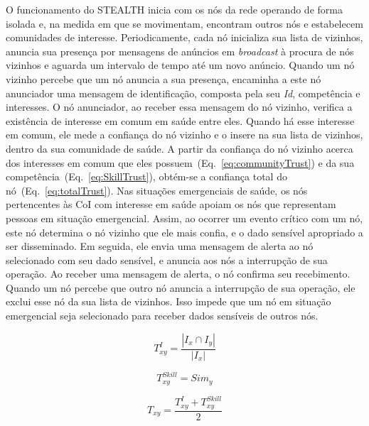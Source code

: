 \documentclass[12pt]{article}
\begin{document}
O funcionamento do \mbox{STEALTH} inicia com os nós da rede operando de forma isolada e, na medida em que se movimentam, encontram outros nós e estabelecem comunidades de interesse. Periodicamente, cada nó inicializa sua lista de vizinhos, anuncia sua presença por mensagens de anúncios em \textit{broadcast} à procura de nós vizinhos e aguarda um intervalo de tempo até um novo anúncio.  Quando um nó vizinho percebe que um nó anuncia a sua presença, encaminha a este nó anunciador uma mensagem de identificação, composta pela seu \textit{Id}, competência e interesses. O nó anunciador, ao receber essa mensagem do nó vizinho, verifica a existência de interesse em comum em saúde entre eles. Quando há esse interesse em comum, ele mede a confiança do nó vizinho e o insere na sua lista de vizinhos, dentro da sua comunidade de saúde. A partir da confiança do nó vizinho acerca dos interesses em comum que eles possuem~(Eq.~\ref{eq:communityTrust}) e da sua competência~(Eq.~\ref{eq:SkillTrust}), obtém-se a confiança total do nó~(Eq.~\ref{eq:totalTrust}). 
%
Nas situações emergenciais de saúde, os nós pertencentes às CoI 
com interesse em saúde apoiam os nós que representam pessoas em situação emergencial. Assim, ao ocorrer um evento crítico com um 
nó, este nó determina o nó vizinho 
que ele mais confia, e o dado sensível apropriado a ser disseminado. Em seguida, ele envia uma mensagem de alerta ao nó selecionado com seu dado sensível, e anuncia aos nós
a interrupção de sua operação. Ao receber uma mensagem de alerta, o nó confirma seu recebimento. Quando um nó percebe que outro nó anuncia a interrupção de sua operação, ele exclui esse nó da sua lista de vizinhos. Isso impede que um nó em situação emergencial seja selecionado para receber dados sensíveis de outros nós. 


\vspace{-0.5cm}

\noindent
\begin{minipage}{.3\linewidth}
\centering
\begin{equation}
T_{xy}^{I} = \frac {|I_x \cap I_y|}{|I_x|}
\label{eq:communityTrust}
\end{equation}
\end{minipage}
\begin{minipage}{.3\linewidth}
\centering
\begin{equation}
T_{xy}^{Skill} = Sim_y
\label{eq:SkillTrust}
\end{equation}
\end{minipage}
\hspace{0.5cm}
\begin{minipage}{.3\linewidth}
\centering
\begin{equation}
T_{xy} = \frac{T_{xy}^{I} + T_{xy}^{Skill}}{2}
\label{eq:totalTrust}
\end{equation}
\end{minipage}
\end{document}
